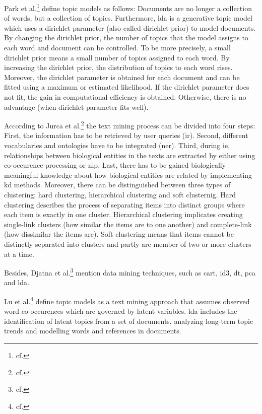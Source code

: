 Park et al.\footnote{cf.\autocite{park_2009}} define topic models as follows: Documents are no longer a collection of words, but a collection of topics. Furthermore, \gls{lda} is a generative topic model which uses a dirichlet parameter (also called dirichlet prior) to model documents. By changing the dirichlet prior, the number of topics that the model assigns to each word and document can be controlled. To be more precisely, a small dirichlet prior means a small number of topics assigned to each word. By increasing the dirichlet prior, the distribution of topics to each word rises. Moreover, the dirichlet parameter is obtained for each document and can be fitted using a maximum or estimated likelihood. If the dirichlet parameter does not fit, the gain in computational efficiency is obtained. Otherwise, there is no advantage (when dirichlet parameter fits well).

According to Jurca et al.\footnote{cf.\autocite{jurca_2016}} the text mining process can be divided into four steps: First, the information has to be retrieved by user queries (\gls{ir}). Second, different vocabularies and ontologies have to be integrated (\gls{ner}). Third, during \gls{ie}, relationships between biological entities in the texts are extracted by either using co-occurence processing or \gls{nlp}. Last, there has to be gained biologically meaningful knowledge about how biological entities are related by implementing \gls{kd} methods.
Moreover, there can be distinguished between three types of clustering: hard clustering, hierarchical clustering and soft clusternig. Hard clustering describes the process of separating items into distinct groups where each item is exactly in one cluster. Hierarchical clustering implicates creating single-link clusters (how similar the items are to one another) and complete-link (how dissimilar the items are). Soft clustering means that items cannot be distinctly separated into clusters and partly are member of two or more clusters at a time.  

Besides, Djatna et al.\footnote{cf.\autocite{djatna_2018}} mention data mining techniques, such as \gls{cart}, \gls{id3}, \gls{dt}, \gls{pca} and \gls{lda}. 

Lu et al.\footnote{cf.\autocite{lu_2016}} define topic models as a text mining approach that assumes observed word co-occurences which are governed by latent variables. \gls{lda} includes the identification of latent topics from a set of documents, analyzing long-term topic trends and modelling words and references in documents.   

